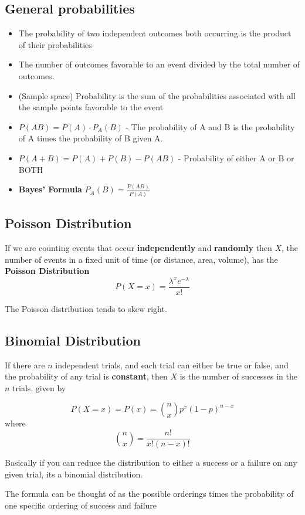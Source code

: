 \documentclass{article}
\begin{document}
\subsection{General probabilities}
\begin{itemize}
    \item The probability of two independent outcomes both occurring is the product of their
    probabilities
	\item The number of outcomes favorable to an event divided by the total number of outcomes.
	\item (Sample space) Probability is the sum of the probabilities associated with all the sample points favorable to the event
	\item $P(AB) = P(A) \cdot P_A(B)$ - The probability of A and B is the probability of A times the probability of B given A.
	\item $P(A+B) = P(A) + P(B) - P(AB)$ - Probability of either A or B or BOTH
	\item \textbf{Bayes' Formula} $P_A(B) = \frac{P(AB)}{P(A)}$
\end{itemize}

\subsection{Poisson Distribution}
If we are counting events that occur \textbf{independently} and \textbf{randomly} then $X$, the number of events in a fixed unit of time (or distance, area, volume), has the \textbf{Poisson Distribution}
$$
P(X=x) = \frac{\lambda^x e^{-\lambda}}{x!}
$$

The Poisson distribution tends to skew right.

\subsection{Binomial Distribution}
If there are $n$ independent trials, and each trial can either be true or false, and the probability of any trial is \textbf{constant}, then $X$ is the number of successes in the $n$ trials, given by

$$
P(X=x) = P(x) = \binom{n}{x} p^x (1-p)^{n-x}
$$
where 
$$
\binom{n}{x} = \frac{n!}{x!(n-x)!}
$$

Basically if you can reduce the distribution to either a success or a failure on any given trial, its a binomial distribution.

The formula can be thought of as the possible orderings times the probability of one specific ordering of success and failure
\end{document}
